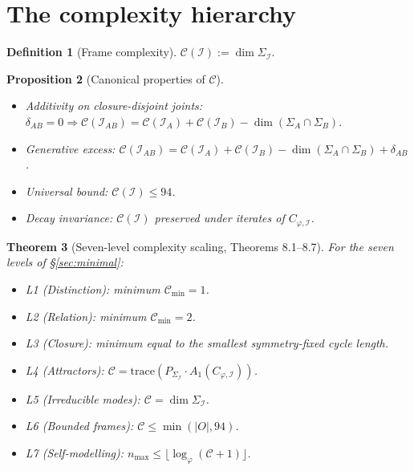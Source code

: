 \documentclass[11pt]{article}
\theoremstyle{plain}
\newtheorem{theorem}{Theorem}[section]
\newtheorem{proposition}[theorem]{Proposition}
\theoremstyle{definition}
\newtheorem{definition}[theorem]{Definition}
\theoremstyle{remark}
\newcommand{\Ical}{\mathcal{I}}
\newcommand{\Ccal}{\mathcal{C}}
\begin{document}
\section{The complexity hierarchy}\label{sec:complexity}

\begin{definition}[Frame complexity]\label{def:complexity}
$\Ccal(\Ical) := \dim \Sigma_\Ical$.
\end{definition}

\begin{proposition}[Canonical properties of $\Ccal$]\label{prop:complexity-properties}
\begin{itemize}[leftmargin=2em]
\item[(C1)] Additivity on closure-disjoint joints: $\delta_{AB} = 0 \Rightarrow \Ccal(\Ical_{AB}) = \Ccal(\Ical_A) + \Ccal(\Ical_B) - \dim(\Sigma_A \cap \Sigma_B)$.
\item[(C2)] Generative excess: $\Ccal(\Ical_{AB}) = \Ccal(\Ical_A) + \Ccal(\Ical_B) - \dim(\Sigma_A \cap \Sigma_B) + \delta_{AB}$.
\item[(C3)] Universal bound: $\Ccal(\Ical) \leq 94$.
\item[(C4)] Decay invariance: $\Ccal(\Ical)$ preserved under iterates of $C_{\varphi,\Ical}$.
\end{itemize}
\end{proposition}

\begin{theorem}[Seven-level complexity scaling, \citet{AlgebraicExistence} Theorems 8.1--8.7]\label{thm:seven-layer}
For the seven levels of \S\ref{sec:minimal}:
\begin{itemize}[leftmargin=2em]
\item L1 (Distinction): minimum $\Ccal_{\min} = 1$.
\item L2 (Relation): minimum $\Ccal_{\min} = 2$.
\item L3 (Closure): minimum equal to the smallest symmetry-fixed cycle length.
\item L4 (Attractors): $\Ccal = \mathrm{trace}(P_{\Sigma_\Ical} \cdot A_1(C_{\varphi,\Ical}))$.
\item L5 (Irreducible modes): $\Ccal = \dim \Sigma_\Ical$.
\item L6 (Bounded frames): $\Ccal \leq \min(|O|, 94)$.
\item L7 (Self-modelling): $n_{\max} \leq \lfloor \log_\varphi(\Ccal + 1) \rfloor$.
\end{itemize}
\end{theorem}
\end{document}
